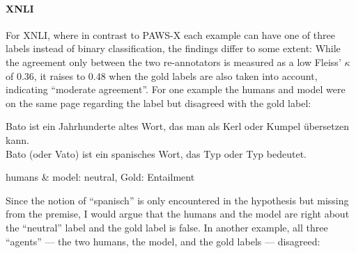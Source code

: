 {%







\paragraph*{XNLI}

For XNLI, where in contrast to PAWS-X each example can have one of three labels instead of
binary classification, the findings differ to some extent: While the agreement only between
the two re-annotators is measured as a low Fleiss' $\kappa$ of 0.36, it raises to 0.48
when the gold labels are also taken into account, indicating ``moderate agreement''. For
one example the humans and model were on the same page regarding the label but disagreed
with the gold label:



\begin{examples}
  \item Bato ist ein Jahrhunderte altes Wort, das man als Kerl oder Kumpel übersetzen kann.\\
        Bato (oder Vato) ist ein spanisches Wort, das Typ oder Typ bedeutet.

        humans \& model: neutral, Gold: Entailment
\end{examples}

Since the notion of ``spanisch'' is only encountered in the hypothesis but missing from the premise,
I would argue that the humans and the model are right about the ``neutral'' label and the gold label
is false.
In another example, all three ``agents'' --- the two humans, the model, and the gold labels --- disagreed:

}
